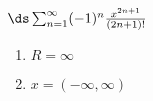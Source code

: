 {$\ds\sum_{n=1}^\infty (-1)^n\frac{x^{2n+1}}{(2n+1)!}$}
{\begin{enumerate}
	\item $R=\infty$
	\item $x=(-\infty,\infty)$
\end{enumerate}}